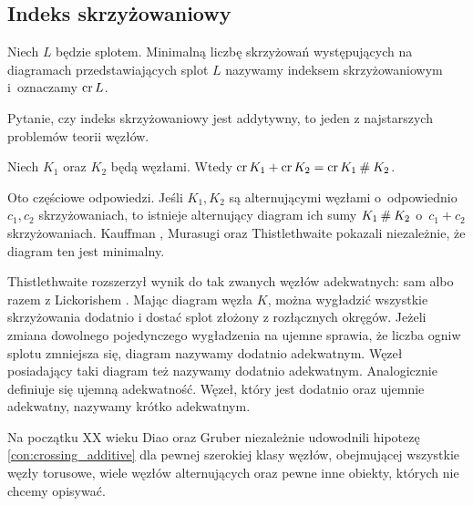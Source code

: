
\subsection{Indeks skrzyżowaniowy}
%
\begin{definition}
    Niech $L$ będzie splotem.
    Minimalną liczbę skrzyżowań występujących na diagramach przedstawiających splot $L$ nazywamy indeksem skrzyżowaniowym i~oznaczamy $\operatorname{cr} L$.
\end{definition}

Pytanie, czy indeks skrzyżowaniowy jest addytywny, to jeden z najstarszych problemów teorii węzłów.

\begin{conjecture}
%
%
\label{con:crossing_additive}%
    Niech $K_1$ oraz $K_2$ będą węzłami.
    Wtedy $\operatorname{cr} K_1 + \operatorname{cr} K_2 = \operatorname{cr} K_1 \mathbin{\#} K_2$.
\end{conjecture}

Oto częściowe odpowiedzi.
Jeśli $K_1, K_2$ są alternującymi węzłami o~odpowiednio $c_1, c_2$ skrzyżowaniach, to istnieje alternujący diagram ich sumy $K_1 \mathbin{\#} K_2$ o~$c_1 + c_2$ skrzyżowaniach.
%
Kauffman \cite[twierdzenie 2.10]{kauffman87}, Murasugi \cite[wniosek 6]{murasugi87} oraz Thistlethwaite \cite[wniosek 1]{thistlethwaite87} pokazali niezależnie, że diagram ten jest minimalny.
%
%
%

Thistlethwaite rozszerzył wynik do tak zwanych węzłów adekwatnych: sam \cite{thistlethwaite88} albo razem z Lickorishem \cite{lickorish88}.
%
%
Mając diagram węzła $K$, można wygładzić wszystkie skrzyżowania dodatnio i dostać splot złożony z rozłącznych okręgów.
Jeżeli zmiana dowolnego pojedynczego wygładzenia na ujemne sprawia, że liczba ogniw splotu zmniejsza się, diagram nazywamy dodatnio adekwatnym.
Węzeł posiadający taki diagram też nazywamy dodatnio adekwatnym.
Analogicznie definiuje się ujemną adekwatność.
Węzeł, który jest dodatnio oraz ujemnie adekwatny, nazywamy krótko adekwatnym.

Na początku XX wieku Diao \cite{diao04} oraz Gruber \cite{gruber03} niezależnie udowodnili hipotezę \ref{con:crossing_additive} dla pewnej szerokiej klasy węzłów, obejmującej wszystkie węzły torusowe, wiele węzłów alternujących oraz pewne inne obiekty, których nie chcemy opisywać.
%
%
%

